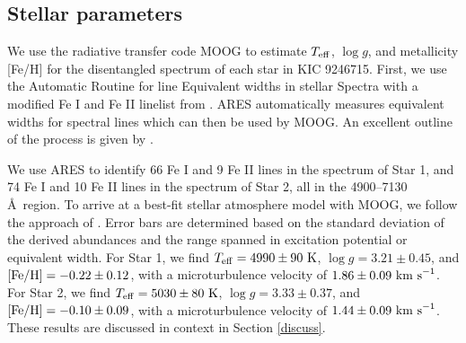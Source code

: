 \subsection{Stellar parameters}\label{parameters}
We use the radiative transfer code MOOG \citep{sne73} to estimate $T_{\rm{eff}}$, $\log g$, and metallicity [Fe/H] for the disentangled spectrum of each star in KIC 9246715. First, we use the Automatic Routine for line Equivalent widths in stellar Spectra \citep[ARES,][]{Sousa_2007} with a modified Fe I and Fe II linelist from \citet{tsa13}. ARES automatically measures equivalent widths for spectral lines which can then be used by MOOG. An excellent outline of the process is given by \citet{Sousa_2014}.

We use ARES to identify 66 Fe I and 9 Fe II lines in the spectrum of Star 1, and 74 Fe I and 10 Fe II lines in the spectrum of Star 2, all in the 4900--7130 \AA \ region. To arrive at a best-fit stellar atmosphere model with MOOG, we follow the approach of \citet{mag13}. Error bars are determined based on the standard deviation of the derived abundances and the range spanned in excitation potential or equivalent width. For Star 1, we find $T_{\rm{eff}} = 4990 \pm 90 \ \rm{K}$, $\log g = 3.21 \pm 0.45$, and $\rm{[Fe/H]} = -0.22 \pm 0.12$, with a microturbulence velocity of $1.86 \pm 0.09 \ \rm{km \ s}^{-1}$. For Star 2, we find $T_{\rm{eff}} = 5030 \pm 80 \ \rm{K}$, $\log g = 3.33 \pm 0.37$, and $\rm{[Fe/H]} = -0.10 \pm 0.09$, with a microturbulence velocity of $1.44 \pm 0.09 \ \rm{km \ s}^{-1}$. These results are discussed in context in Section \ref{discuss}.
  